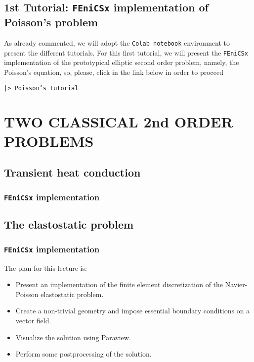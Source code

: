 \section{1st Tutorial: \texttt{FEniCSx} implementation of Poisson's problem}

As already commented, we will adopt the \texttt{Colab notebook} environment
to present the different tutorials. For this first tutorial, 
we will present the \texttt{FEniCSx} implementation
of the prototypical elliptic second order problem, namely, the Poisson's 
equation, so, please, click in the link below in order to proceed

 \href{https://github.com/}{\texttt{|> Poisson's tutorial}}

\setchapterpreamble[u]{\margintoc}
\chapter{TWO CLASSICAL 2nd ORDER PROBLEMS}

\section{Transient heat conduction}

\subsection{\texttt{FEniCSx} implementation}

\section{The elastostatic problem}

\subsection{\texttt{FEniCSx} implementation}


\iffalse

The plan for this lecture is:

\begin{itemize}
\item Present an implementation of the finite element discretization
of the Navier-Poisson elastostatic problem.
\item Create a non-trivial geometry and impose essential boundary conditions
on a vector field.
\item Visualize the solution using Paraview.
\item Perform some postprocessing of the solution.
\end{itemize}


